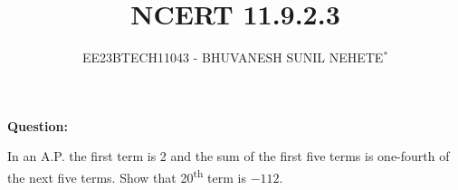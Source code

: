 \documentclass[journal,12pt,twocolumn]{IEEEtran}
\theoremstyle{remark}
\begin{document}

\vspace{3cm}

\title{NCERT 11.9.2.3}
\author{EE23BTECH11043 - BHUVANESH SUNIL NEHETE$^{*}$%
}
\maketitle
\newpage
\bigskip

\renewcommand{\thefigure}{\theenumi}
\renewcommand{\thetable}{\theenumi}



\textbf{Question:}

In an A.P. the first term is 2 and the sum of the first five terms is one-fourth of the next five terms. Show that 20\textsuperscript{th} term is $-112$.

\solution


\end{document}
